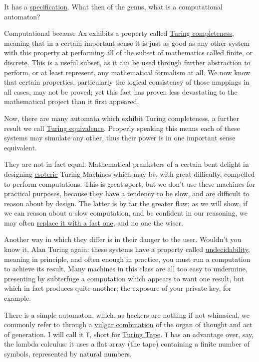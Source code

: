 \documentclass[twoside]{article}
\begin{document}
It has a \href{https://github.com/mnemnion/ax/blob/master/ax%20spec.md}{specification}. What then of the genus, what is a computational automaton?

Computational because Ax exhibits a property called \href{https://en.wikipedia.org/wiki/Turing_completeness}{Turing completeness}, meaning that in a certain important sense it is just as good as any other system with this property at performing all of the subset of mathematics called finite, or discrete. This is a useful subset, as it can be used through further abstraction to perform, or at least represent, any mathematical formalism at all. We now know that certain properties, particularly the logical consistency of those mappings in all cases, may not be proved; yet this fact has proven less devastating to the mathematical project than it first appeared.

Now, there are many automata which exhibit Turing completeness, a further result we call \href{https://en.wikipedia.org/wiki/Turing_equivalence}{Turing equivalence}. Properly speaking this means each of these systems may simulate any other, thus their power is in one important sense equivalent.

They are not in fact equal. Mathematical pranksters of a certain bent delight in designing \href{https://esolangs.org/wiki/Ax}{esoteric} Turing Machines which may be, with great difficulty, compelled to perform computations. This is great sport, but we don't use these machines for practical purposes, because they have a tendency to be slow, and are difficult to reason about by design. The latter is by far the greater flaw; as we will show, if we can reason about a slow computation, and be confident in our reasoning, we may often \href{https://en.wikipedia.org/wiki/Rewriting}{replace it with a fast one}, and no one the wiser.

Another way in which they differ is in their danger to the user. Wouldn't you know it, Alan Turing again: these systems have a property called \href{https://en.wikipedia.org/wiki/Undecidable_problem}{undecidability}, meaning in principle, and often enough in practice, you must run a computation to achieve its result. Many machines in this class are all too easy to undermine, presenting by subterfuge a computation which appears to want one result, but which in fact produces quite another; the exposure of your private key, for example.

There is a simple automaton, which, as hackers are nothing if not whimsical, we commonly refer to through a \href{https://en.wikipedia.org/wiki/Brainfuck}{vulgar combination} of the organ of thought and act of generation. I will call it \texttt{T}, short for \href{https://en.wikipedia.org/wiki/Turing_machine}{Turing Tape}. \texttt{T} has an advantage over, say, the lambda calculus: it uses a flat array (the tape) containing a finite number of symbols, represented by natural numbers.
\end{document}
